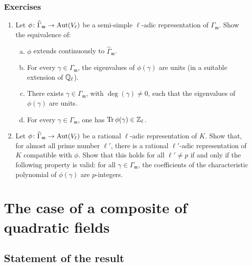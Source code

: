 \subsubsection*{Exercises}
\begin{enumerate}[1)]
\item Let $\phi\colon \widehat{\Gamma}_{\mathfrak{m}} \to \operatorname{Aut}(V_\ell)$ be a
	semi-simple $\ell$-adic representation of $\Gamma_{\mathfrak{m}}$. Show
	the equivalence of:
	\begin{enumerate}[(a)]
	\item $\phi$ extends continuously to $\widehat{\Gamma}_{\mathfrak{m}}$.
	\item For every $\gamma \in \Gamma_{\mathfrak{m}}$, the eigenvalues of
		$\phi(\gamma)$ are units (in a suitable extension of
		$\mathbb{Q}_\ell$).
	\item There exists $\gamma \in \Gamma_{\mathfrak{m}}$, with
		$\deg(\gamma) \ne 0$, such that the eigenvalues of
		$\phi(\gamma)$ are units.
	\item For every $\gamma \in \Gamma_{\mathfrak{m}}$, one has
		$\operatorname{Tr}\phi(\gamma) \in \mathbb{Z}_\ell$.
	\end{enumerate}

\item Let $\phi\colon \widehat{\Gamma}_{\mathfrak{m}} \to \operatorname{Aut}(V_\ell)$ be a
	rational $\ell$-adic representation of $K$.  Show that, for almost all
	prime number $\ell'$, there is a rational $\ell'$-adic representation
	of $K$ compatible with $\phi$. Show that this holds for all $\ell' \ne
	p$ if and only if the following property is valid: for all $\gamma \in
	\Gamma_{\mathfrak{m}}$, the coefficients of the characteristic
	polynomial of $\phi(\gamma)$ are $p$-integers.
\end{enumerate}

\section{The case of a composite of quadratic fields}
\label{sec:III_3}
\dpage

\subsection{Statement of the result}
\label{sec:III_31}

